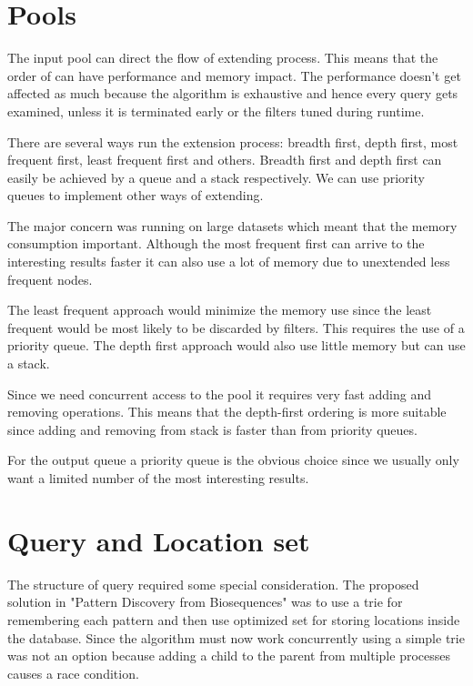 \section{Pools}

The input pool can direct the flow of extending process. This means that the order of can have performance and memory impact. The performance doesn't get affected as much because the algorithm is exhaustive and hence every query gets examined, unless it is terminated early or the filters tuned during runtime.

There are several ways run the extension process: breadth first, depth first, most frequent first, least frequent first and others. Breadth first and depth first can easily be achieved by a queue and a stack respectively. We can use priority queues to implement other ways of extending.

The major concern was running on large datasets which meant that the memory consumption important. Although the most frequent first can arrive to the interesting results faster it can also use a lot of memory due to unextended less frequent nodes.

The least frequent approach would minimize the memory use since the least frequent would be most likely to be discarded by filters. This requires the use of a priority queue. The depth first approach would also use little memory but can use a stack.

Since we need concurrent access to the pool it requires very fast adding and removing operations. This means that the depth-first ordering is more suitable since adding and removing from stack is faster than from priority queues.

For the output queue a priority queue is the obvious choice since we usually only want a limited number of the most interesting results.

\section{Query and Location set}

The structure of query required some special consideration. The proposed solution in "Pattern Discovery from Biosequences" was to use a trie for remembering each pattern and then use optimized set for storing locations inside the database. Since the algorithm must now work concurrently using a simple trie was not an option because adding a child to the parent from multiple processes causes a race condition. 

